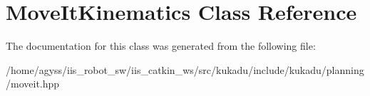 \hypertarget{classMoveItKinematics}{}\section{Move\+It\+Kinematics Class Reference}
\label{classMoveItKinematics}


The documentation for this class was generated from the following file\+:\begin{DoxyCompactItemize}
\item 
/home/agyss/iis\+\_\+robot\+\_\+sw/iis\+\_\+catkin\+\_\+ws/src/kukadu/include/kukadu/planning/moveit.\+hpp\end{DoxyCompactItemize}
